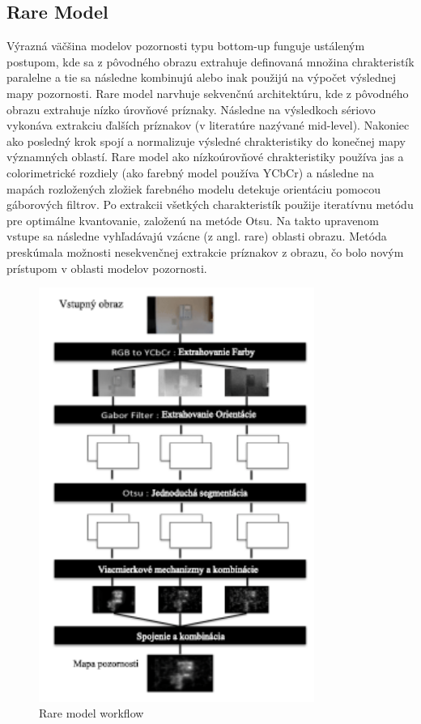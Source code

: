 \subsection{Rare Model}
Výrazná väčšina modelov pozornosti typu bottom-up funguje ustáleným postupom, kde sa z pôvodného obrazu extrahuje definovaná množina chrakteristík paralelne a tie sa následne kombinujú alebo inak použijú na výpočet výslednej mapy pozornosti.
Rare model narvhuje sekvenčnú architektúru, kde z pôvodného obrazu extrahuje nízko úrovňové príznaky.
Následne na výsledkoch sériovo vykonáva extrakciu ďalších príznakov (v literatúre nazývané mid-level).
Nakoniec ako posledný krok spojí a normalizuje výsledné chrakteristiky do konečnej mapy významných oblastí.
Rare model ako nízkoúrovňové chrakteristiky používa jas a colorimetrické rozdiely (ako farebný model používa YCbCr) a následne na mapách rozložených zložiek farebného modelu detekuje orientáciu pomocou gáborových filtrov\cite{rare-1}.
Po extrakcii všetkých charakteristík použije iteratívnu metódu pre optimálne kvantovanie, založenú na metóde Otsu\cite{otsu}.
Na takto upravenom vstupe sa následne vyhľadávajú vzácne (z angl. rare) oblasti obrazu.
Metóda preskúmala možnosti nesekvenčnej extrakcie príznakov z obrazu, čo bolo novým prístupom v oblasti modelov pozornosti.

\begin{figure}[H]
  \centering
  \includegraphics[width=9cm]{pics/rare-1.png}
  \caption{Rare model workflow\cite{rare-1}}\label{wrap-fig:3}
\end{figure}

